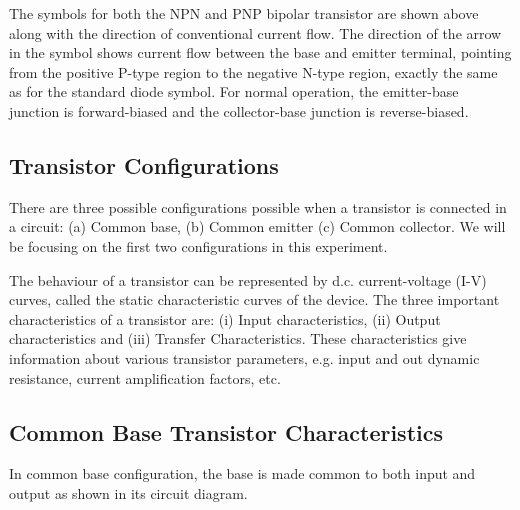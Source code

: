 The symbols for both the NPN and PNP bipolar transistor are shown above along with the direction of conventional current flow. The direction of the arrow in the symbol shows current flow between the base and emitter terminal, pointing from the positive P-type region to the negative N-type region, exactly the same as for the standard diode symbol. For normal operation, the emitter-base junction is forward-biased and the collector-base junction is reverse-biased.

\subsection*{Transistor Configurations}

There are three possible configurations possible when a transistor is connected in a circuit: (a) Common base, (b) Common emitter (c) Common collector. We will be focusing on the first two configurations in this experiment. 

The behaviour of a transistor can be represented by d.c. current-voltage (I-V) curves, called the static characteristic curves of the device. The three important characteristics of a transistor are: (i) Input characteristics, (ii) Output characteristics and (iii) Transfer Characteristics. These characteristics give information about various transistor parameters, e.g. input and out dynamic resistance, current amplification factors, etc.

\subsection{Common Base Transistor Characteristics}

In common base configuration, the base is made common to both input and output as shown in its circuit diagram.\\

